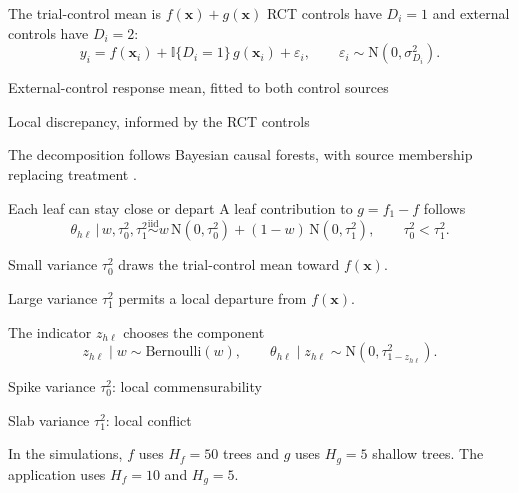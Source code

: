 \documentclass[11pt,aspectratio=169]{beamer}
\newcommand{\Normal}{\mathrm{N}}
\newcommand{\bx}{\bm{x}}
\newcommand{\given}{\,\vert\,}
\newcommand{\Ber}{\mathrm{Bernoulli}}
\newcommand{\key}[1]{{\color{AccentBlue}\textbf{#1}}}
\begin{document}
\begin{frame}{The trial-control mean is \(f(\bx)+g(\bx)\)}
  \large
  RCT controls have $D_i=1$ and external controls have $D_i=2$:
  \[
    y_i=f(\bx_i)+\mathbb{I}\{D_i=1\}\,g(\bx_i)+\varepsilon_i,
    \qquad \varepsilon_i\sim\Normal(0,\sigma^2_{D_i}).
  \]

  \vspace{0.7em}
  \begin{description}\setlength\itemsep{0.8em}
    \item[\key{\(f(\bx)\)}] External-control response mean, fitted to both control sources
    \item[\key{\(g(\bx)\)}] Local discrepancy, informed by the RCT controls
  \end{description}

  \vfill
  {\small The decomposition follows Bayesian causal forests, with source membership replacing treatment \citep{Hahn2020BCF}.}
\end{frame}



\begin{frame}{Each leaf can stay close or depart}
  \large
  A leaf contribution to $g=f_1-f$ follows
  \[
    \theta_{h\ell}\given w,\tau_0^2,\tau_1^2
    \stackrel{\mathrm{iid}}{\sim}
    w\,\Normal(0,\tau_0^2)+(1-w)\,\Normal(0,\tau_1^2),
    \qquad \tau_0^2<\tau_1^2.
  \]

  \vspace{0.7em}
  \begin{description}\setlength\itemsep{0.9em}
    \item[\key{Spike}] Small variance $\tau_0^2$ draws the trial-control mean toward $f(\bx)$.
    \item[\key{Slab}] Large variance $\tau_1^2$ permits a local departure from $f(\bx)$.
  \end{description}
\end{frame}

\begin{frame}{The indicator \(z_{h\ell}\) chooses the component}
  \large
  \[
    z_{h\ell}\mid w\sim\Ber(w),\qquad
    \theta_{h\ell}\mid z_{h\ell}
    \sim\Normal\!\left(0,\tau_{1-z_{h\ell}}^2\right).
  \]

  \vspace{0.8em}
  \begin{description}\setlength\itemsep{1.0em}
    \item[\key{\(z_{h\ell}=1\)}] Spike variance $\tau_0^2$: local commensurability
    \item[\key{\(z_{h\ell}=0\)}] Slab variance $\tau_1^2$: local conflict
  \end{description}

  \vfill
  {\small In the simulations, $f$ uses $H_f=50$ trees and $g$ uses $H_g=5$ shallow trees. The application uses $H_f=10$ and $H_g=5$.}
\end{frame}
\end{document}
